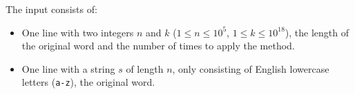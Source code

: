 
    The input consists of:
    \begin{itemize}
        \item One line with two integers $n$ and $k$ ($1 \leq n \leq 10^5$, $1 \leq k \leq 10^{18}$),
            the length of the original word and the number of times to apply the method.
        \item One line with a string $s$ of length $n$, only consisting of English lowercase letters (\texttt{a-z}),
            the original word.
    \end{itemize}
